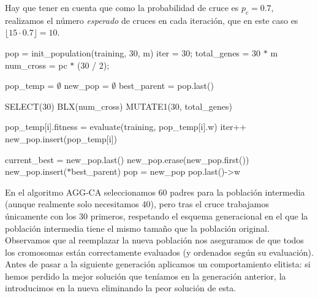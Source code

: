 \documentclass[12pt]{article}
\begin{document}
Hay que tener en cuenta que como la probabilidad de cruce es $p_c = 0.7$, realizamos el número \textit{esperado} de cruces en cada iteración, que en este caso es $\lfloor 15 \cdot 0.7 \rfloor = 10$.

\begin{algorithm}[h!]
\begin{algorithmic}

    \State pop = init\_population(training, 30, m) 
    \State iter = 30;
    \State total\_genes = 30 $\ast$ m
    \State num\_cross = pc $\ast$ (30 / 2);  

        \State pop\_temp = $\emptyset$  
        \State new\_pop = $\emptyset$  
        \State best\_parent = pop.last()  

        \State SELECT(30) 
        \State BLX(num\_cross)  
        \State MUTATE1(30, total\_genes)

          
                \State pop\_temp[i].fitness = evaluate(training, pop\_temp[i].w)
                \State iter++
            \EndIf
            \State new\_pop.insert(pop\_temp[i])
        \EndFor
   
        \State current\_best = new\_pop.last()
          
          \State new\_pop.erase(new\_pop.first())
          \State new\_pop.insert($\ast$best\_parent)
        \EndIf
        \State pop = new\_pop 
    \EndWhile
    \State \Return pop.last()->w
\EndFunction
  
\end{algorithmic}
\end{algorithm}

En el algoritmo AGG-CA seleccionamos $60$ padres para la población intermedia (aunque realmente solo necesitamos 40), pero tras el cruce trabajamos únicamente con los $30$ primeros, respetando el esquema generacional en el que la población intermedia tiene el mismo tamaño que la población original.\\

Observamos que al reemplazar la nueva población nos aseguramos de que todos los cromosomas están correctamente evaluados (y ordenados según su evaluación). Antes de pasar a la siguiente generación aplicamos un comportamiento elitista: si hemos perdido la mejor solución que teníamos en la generación anterior, la introducimos en la nueva eliminando la peor solución de esta.
\end{document}
